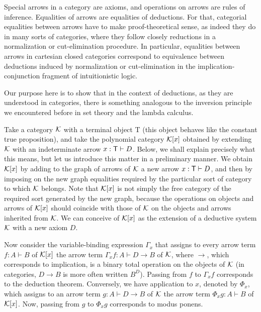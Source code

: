 \documentclass[12pt]{article}
\begin{document}
Special arrows in a category are axioms, and operations on arrows are rules
of inference. Equalities of arrows are equalities of deductions. For that,
categorial equalities between arrows have to make proof-theoretical sense,
as indeed they do in many sorts of categories, where they follow closely
reductions in a normalization or cut-elimination procedure. In particular,
equalities between arrows in cartesian closed categories correspond to
equivalence between deductions induced by normalization or cut-elimination
in the implication-conjunction fragment of intuitionistic logic.

Our purpose here is to show that in the context of deductions, as they are
understood in categories, there is something analogous to the inversion
principle we encountered before in set theory and the lambda calculus.

Take a category ${\cal K}$ with a terminal object {\sf T} (this object
behaves like the constant true proposition), and take the polynomial
category ${\cal K}[x]$ obtained by extending ${\cal K}$ with an
indeterminate arrow $x:{\sf T}\vdash D$. Below, we shall explain precisely
what this means, but let us introduce this matter in a preliminary manner.
We obtain ${\cal K}[x]$ by adding to the graph of arrows of ${\cal K}$ a new
arrow $x:{\sf T}\vdash D$, and then by imposing on the new graph equalities
required by the particular sort of category to which ${\cal K}$ belongs.
Note that ${\cal K}[x]$ is not simply the free category of the required sort
generated by the new graph, because the operations on objects and arrows of $%
{\cal K}[x]$ should coincide with those of ${\cal K}$ on the objects and
arrows inherited from ${\cal K}$. We can conceive of ${\cal K}[x]$ as the
extension of a deductive system ${\cal K}$ with a new axiom $D$.

Now consider the variable-binding expression $\Gamma _{x}$ that assigns to
every arrow term $f:A\vdash B$ of ${\cal K}[x]$ the arrow term $\Gamma
_{x}f:A\vdash D\rightarrow B$ of ${\cal K}$, where $\rightarrow $, which
corresponds to implication, is a binary total operation on the objects of $%
{\cal K}$ (in categories, $D\rightarrow B$ is more often written $B^{D}$).
Passing from $f$ to $\Gamma _{x}f$ corresponds to the deduction theorem.
Conversely, we have application to $x$, denoted by $\Phi _{x}$, which
assigns to an arrow term $g:A\vdash D\rightarrow B$ of ${\cal K}$ the arrow
term $\Phi _{x}g:A\vdash B$ of ${\cal K}[x]$. Now, passing from $g$ to $\Phi
_{x}g$ corresponds to modus ponens.
\end{document}
